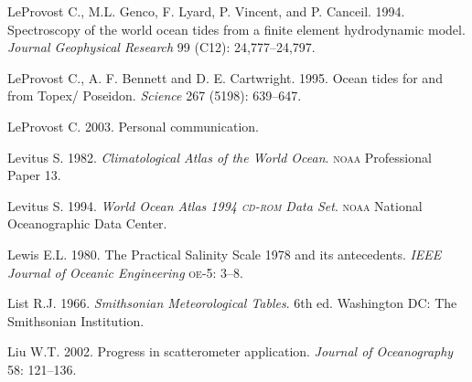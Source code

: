 \begin{thebibliography}{999}
LeProvost C., M.L. Genco, F. Lyard, P. Vincent, and
P. Canceil. 1994. Spectroscopy of the world ocean tides from a finite
element hydrodynamic model. \textit{Journal Geophysical Research} 99
(C12): 24,777--24,797.
%

LeProvost C., A. F. Bennett and D. E. Cartwright.  1995. Ocean tides
for and from Topex/ Poseidon. \textit{Science} 267 (5198): 639--647.
%

LeProvost C. 2003. Personal communication.

Levitus S.  1982. \textit{Climatological Atlas of the World
  Ocean}. \textsc{noaa} Professional Paper 13.
%

Levitus S.  1994. \textit{World Ocean Atlas 1994 \textsc{cd-rom} Data
  Set}. \textsc{noaa} National Oceanographic Data Center.
%

Lewis E.L.  1980. The Practical Salinity Scale 1978 and its
antecedents.  \textit{IEEE Journal of Oceanic Engineering}
\textsc{oe}-5: 3--8.
%

List R.J.  1966. \textit{Smithsonian Meteorological Tables}. 6th
ed. Washington DC: The Smithsonian Institution.
%

Liu W.T.  2002. Progress in scatterometer application. \textit{Journal
  of Oceanography} 58: 121--136.
%


\end{thebibliography}
